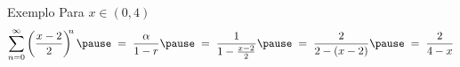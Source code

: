 \begin{frame}{Exemplo \theexemplo}
  Para \(x\in (0, 4)\)
  \[
    \sum_{n=0}^\infty \left(\frac{x-2}{2}\right)^{\!\!n}
    \pause \;=\;
    \frac{\alpha}{1-r}
    \pause \;=\;
    \frac{1}{1-\frac{x-2}{2}}
    \pause \;=\;
    \frac{2}{2-(x-2)}
    \pause \;=\;
    \frac{2}{4-x}
  \]
\end{frame}


\begin{frame}{\contentsname}
  \tableofcontents
\end{frame}


